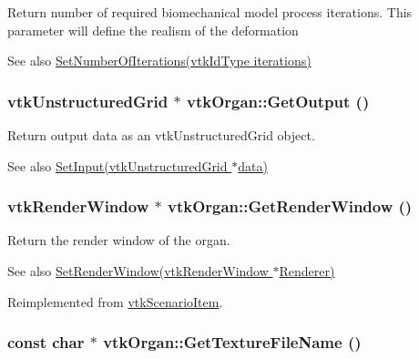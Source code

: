 Return number of required biomechanical model process iterations. This parameter will define the realism of the deformation \begin{DoxySeeAlso}{See also}
\hyperlink{classvtkOrgan_a97ed046b7c9b8c3cc87939db46e4ec01}{SetNumberOfIterations(vtkIdType iterations)} 
\end{DoxySeeAlso}
\hypertarget{classvtkOrgan_af8cbaa36f1dbf97b5314dfe128aaf444}{
\subsubsection[{GetOutput}]{\setlength{\rightskip}{0pt plus 5cm}vtkUnstructuredGrid $\ast$ vtkOrgan::GetOutput ()}}
\label{classvtkOrgan_af8cbaa36f1dbf97b5314dfe128aaf444}


Return output data as an vtkUnstructuredGrid object. \begin{DoxySeeAlso}{See also}
\hyperlink{classvtkOrgan_abfe750f8e4ec9bbd0b9f182894bf2c97}{SetInput(vtkUnstructuredGrid $\ast$data)} 
\end{DoxySeeAlso}
\hypertarget{classvtkOrgan_ae670e2727313073a9659a2795ce64c98}{
\subsubsection[{GetRenderWindow}]{\setlength{\rightskip}{0pt plus 5cm}vtkRenderWindow $\ast$ vtkOrgan::GetRenderWindow ()}}
\label{classvtkOrgan_ae670e2727313073a9659a2795ce64c98}


Return the render window of the organ. \begin{DoxySeeAlso}{See also}
\hyperlink{classvtkOrgan_a2b6a862da0f1ca6cd192138cdd00b04b}{SetRenderWindow(vtkRenderWindow $\ast$Renderer)} 
\end{DoxySeeAlso}


Reimplemented from \hyperlink{classvtkScenarioItem_a9d7908b11d2a477827342c05bb505e66}{vtkScenarioItem}.\hypertarget{classvtkOrgan_aaec0735181654c6500d0767eed30b94d}{
\subsubsection[{GetTextureFileName}]{\setlength{\rightskip}{0pt plus 5cm}const char $\ast$ vtkOrgan::GetTextureFileName ()}}
\label{classvtkOrgan_aaec0735181654c6500d0767eed30b94d}


